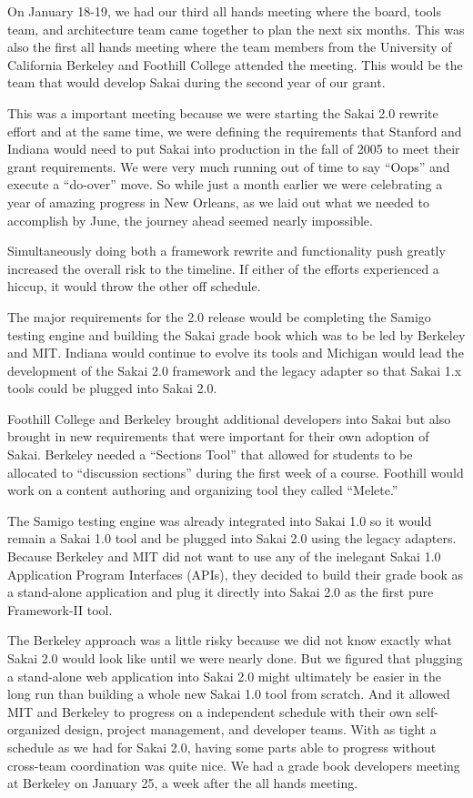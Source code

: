 \documentclass[12pt]{book}
\begin{document}
On January 18-19, we had our third all hands meeting where
the board, tools team, and architecture team came together
to plan the next six months.  This was also the first
all hands meeting where the team members from the
University of California Berkeley and Foothill College
attended the meeting.  This would be the team that would
develop Sakai during the second year of our grant.

This was a important
meeting because we were starting the Sakai 2.0
rewrite effort and at the same time, we were defining the
requirements that Stanford and Indiana would need to put
Sakai into production in the fall of 2005 to meet their
grant requirements.  We were very much running out of
time to say ``Oops'' and execute a ``do-over'' move.
So while just a month earlier we were
celebrating a year of amazing progress in New Orleans,
as we laid out what we needed to accomplish by June,
the journey ahead seemed nearly impossible.

Simultaneously doing both a framework rewrite and
functionality push greatly increased the overall
risk to the timeline.  If either of the efforts
experienced a hiccup, it would throw the other off
schedule.

The major requirements for the 2.0 release would be
completing the Samigo testing engine and building
the Sakai grade book which was to be led by Berkeley
and MIT.  Indiana would continue to evolve its tools
and Michigan would lead the development of the Sakai
2.0 framework and the legacy adapter so that Sakai 1.x
tools could be plugged into Sakai 2.0.

Foothill College and Berkeley brought additional developers
into Sakai but also brought in new requirements that
were important for their own adoption of Sakai.  Berkeley
needed a ``Sections Tool'' that allowed for students
to be allocated to ``discussion sections'' during the
first week of a course.  Foothill would work on a
content authoring and organizing tool they called
``Melete.''

The Samigo testing engine was already integrated into
Sakai 1.0 so it would remain a Sakai 1.0 tool
and be plugged into Sakai 2.0 using the legacy
adapters.  Because Berkeley and MIT did not want to use
any of the inelegant Sakai 1.0 Application
Program Interfaces (APIs),
they decided to build their grade book as a
stand-alone application and plug it directly into
Sakai 2.0 as the first pure Framework-II tool.

The Berkeley approach was a little risky because
we did not know exactly what Sakai 2.0 would look like
until we were nearly done.   But we figured that
plugging a stand-alone web application into Sakai 2.0
might ultimately be easier in the long run than
building a whole new Sakai 1.0 tool from scratch.
And it allowed MIT and Berkeley to progress on
a independent schedule with their own
self-organized design, project management,
and developer teams.  With as
tight a schedule as we had for Sakai 2.0, having
some parts able to progress without cross-team
coordination was quite nice.  We had a grade book
developers meeting at Berkeley on January 25, a week
after the all hands meeting.
\end{document}
